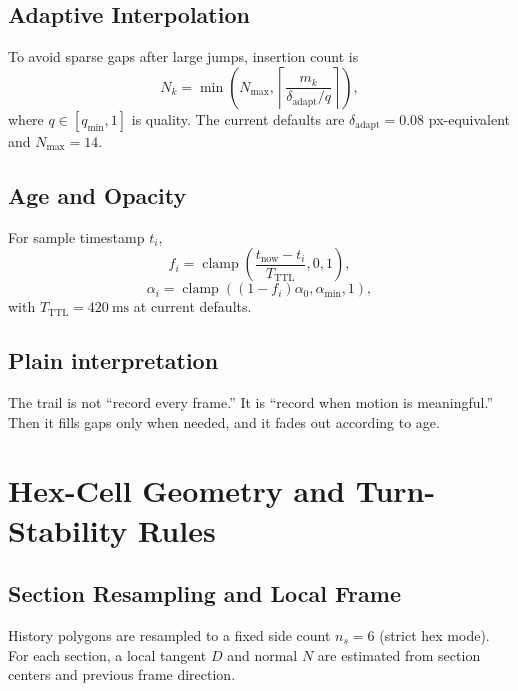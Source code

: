 \documentclass[journal]{IEEEtran}
\begin{document}
\subsection{Adaptive Interpolation}
To avoid sparse gaps after large jumps, insertion count is
\begin{equation}
N_k=\min\!\left(N_{\max},\left\lceil \frac{m_k}{\delta_{\text{adapt}}/q}\right\rceil\right),
\end{equation}
where \(q\in[q_{\min},1]\) is quality. The current defaults are \(\delta_{\text{adapt}}=0.08\) px-equivalent and \(N_{\max}=14\).

\subsection{Age and Opacity}
For sample timestamp \(t_i\),
\begin{equation}
f_i=\operatorname{clamp}\!\left(\frac{t_{\text{now}}-t_i}{T_{\text{TTL}}},0,1\right),
\end{equation}
\begin{equation}
\alpha_i=\operatorname{clamp}\!\left((1-f_i)\alpha_0,\alpha_{\min},1\right),
\end{equation}
with \(T_{\text{TTL}}=\SI{420}{\milli\second}\) at current defaults.

\subsection{Plain interpretation}
The trail is not ``record every frame.'' It is ``record when motion is meaningful.'' Then it fills gaps only when needed, and it fades out according to age.

\section{Hex-Cell Geometry and Turn-Stability Rules}

\subsection{Section Resampling and Local Frame}
History polygons are resampled to a fixed side count \(n_s=6\) (strict hex mode). For each section, a local tangent \(D\) and normal \(N\) are estimated from section centers and previous frame direction.
\end{document}
